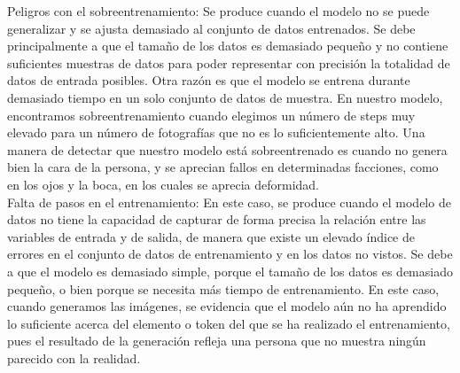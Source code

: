 Peligros con el sobreentrenamiento: Se produce cuando el modelo no se puede generalizar y se ajusta demasiado al conjunto de datos entrenados. Se debe principalmente a que el tamaño de los datos es demasiado pequeño y no contiene suficientes muestras de datos para poder representar con precisión la totalidad de datos de entrada posibles. Otra razón es que el modelo se entrena durante demasiado tiempo en un solo conjunto de datos de muestra. En nuestro modelo, encontramos sobreentrenamiento cuando elegimos un número de steps muy elevado para un número de fotografías que no es lo suficientemente alto. Una manera de detectar que nuestro modelo está sobreentrenado es cuando no genera bien la cara de la persona, y se aprecian fallos en determinadas facciones, como en los ojos y la boca, en los cuales se aprecia deformidad.\\

Falta de pasos en el entrenamiento: En este caso, se produce cuando el modelo de datos no tiene la capacidad de capturar de forma precisa la relación entre las variables de entrada y de salida, de manera que existe un elevado índice de errores en el conjunto de datos de entrenamiento y en los datos no vistos. Se debe a que el modelo es demasiado simple, porque el tamaño de los datos es demasiado pequeño, o bien porque se necesita más tiempo de entrenamiento. En este caso, cuando generamos las imágenes, se evidencia que el modelo aún no ha aprendido lo suficiente acerca del elemento o token del que se ha realizado el entrenamiento, pues el resultado de la generación refleja una persona que no muestra ningún parecido con la realidad.\\

